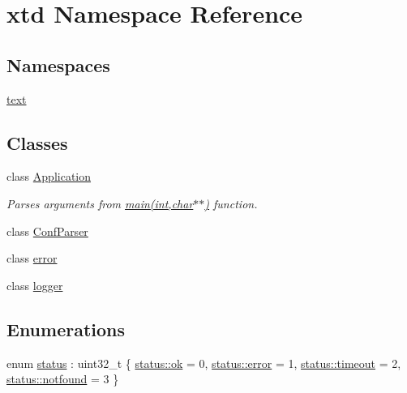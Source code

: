 \hypertarget{namespacextd}{}\section{xtd Namespace Reference}
\label{namespacextd}
\subsection*{Namespaces}
\begin{DoxyCompactItemize}
\item 
 \hyperlink{namespacextd_1_1text}{text}
\end{DoxyCompactItemize}
\subsection*{Classes}
\begin{DoxyCompactItemize}
\item 
class \hyperlink{classxtd_1_1Application}{Application}
\begin{DoxyCompactList}\small\item\em Parses arguments from \hyperlink{doc_2example_2Application_8hh_a6b77b2233054447db17959182b5fb02b}{main(int,char$\ast$$\ast$)} function. \end{DoxyCompactList}\item 
class \hyperlink{classxtd_1_1ConfParser}{Conf\+Parser}
\item 
class \hyperlink{classxtd_1_1error}{error}
\item 
class \hyperlink{classxtd_1_1logger}{logger}
\end{DoxyCompactItemize}
\subsection*{Enumerations}
\begin{DoxyCompactItemize}
\item 
enum \hyperlink{namespacextd_a68ed4fe8e9c11116b68efe5b102aec50}{status} \+: uint32\+\_\+t \{ \hyperlink{namespacextd_a68ed4fe8e9c11116b68efe5b102aec50a444bcb3a3fcf8389296c49467f27e1d6}{status\+::ok} = 0, 
\hyperlink{namespacextd_a68ed4fe8e9c11116b68efe5b102aec50acb5e100e5a9a3e7f6d1fd97512215282}{status\+::error} = 1, 
\hyperlink{namespacextd_a68ed4fe8e9c11116b68efe5b102aec50a90272dda245ae1fb3cf197e91a8689dc}{status\+::timeout} = 2, 
\hyperlink{namespacextd_a68ed4fe8e9c11116b68efe5b102aec50ac2adf6ecc220f2711801d6e466340183}{status\+::notfound} = 3
 \}
\end{DoxyCompactItemize}
